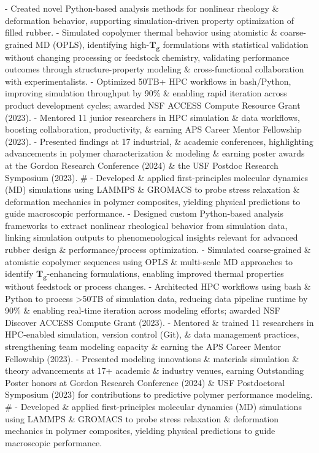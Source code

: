- Created novel Python-based analysis methods for nonlinear rheology \& deformation behavior, supporting simulation-driven property optimization of filled rubber.
- Simulated copolymer thermal behavior using atomistic \& coarse-grained MD (OPLS), identifying high-$\bm{T_g}$ formulations with statistical validation without changing processing or feedstock chemistry, validating performance outcomes through structure-property modeling \& cross-functional collaboration with experimentalists.
- Optimized 50TB+ HPC workflows in bash/Python, improving simulation throughput by 90\% \& enabling rapid iteration across product development cycles; awarded NSF ACCESS Compute Resource Grant (2023).
- Mentored 11 junior researchers in HPC simulation \& data workflows, boosting collaboration, productivity, \& earning APS Career Mentor Fellowship (2023).
- Presented findings at 17 industrial, \& academic conferences, highlighting advancements in polymer characterization \& modeling \& earning poster awards at the Gordon Research Conference (2024) \& the USF Postdoc Research Symposium (2023).
#
- Developed \& applied first-principles molecular dynamics (MD) simulations using LAMMPS \& GROMACS to probe stress relaxation \& deformation mechanics in polymer composites, yielding physical predictions to guide macroscopic performance.
- Designed custom Python-based analysis frameworks to extract nonlinear rheological behavior from simulation data, linking simulation outputs to phenomenological insights relevant for advanced rubber design \& performance/process optimization.
- Simulated coarse-grained \& atomistic copolymer sequences using OPLS \& multi-scale MD approaches to identify $\bm{T_g}$-enhancing formulations, enabling improved thermal properties without feedstock or process changes.
- Architected HPC workflows using bash \& Python to process >50TB of simulation data, reducing data pipeline runtime by 90\% \& enabling real-time iteration across modeling efforts; awarded NSF Discover ACCESS Compute Grant (2023).
- Mentored \& trained 11 researchers in HPC-enabled simulation, version control (Git), \& data management practices, strengthening team modeling capacity \& earning the APS Career Mentor Fellowship (2023).
- Presented modeling innovations \& materials simulation \& theory advancements at 17+ academic \& industry venues, earning Outstanding Poster honors at Gordon Research Conference (2024) \& USF Postdoctoral Symposium (2023) for contributions to predictive polymer performance modeling.
#
- Developed \& applied first-principles molecular dynamics (MD) simulations using LAMMPS \& GROMACS to probe stress relaxation \& deformation mechanics in polymer composites, yielding physical predictions to guide macroscopic performance.

